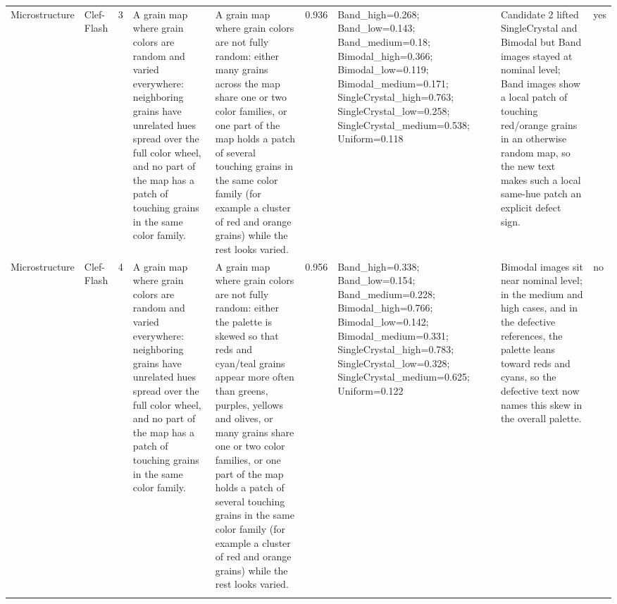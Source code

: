 \begin{table}
\begin{tabular}[t]{llrllrlll}
Microstructure & Clef-Flash & 3 & A grain map where grain colors are random and varied everywhere: neighboring grains have unrelated hues spread over the full color wheel, and no part of the map has a patch of touching grains in the same color family. & A grain map where grain colors are not fully random: either many grains across the map share one or two color families, or one part of the map holds a patch of several touching grains in the same color family (for example a cluster of red and orange grains) while the rest looks varied. & 0.936 & Band\_high=0.268; Band\_low=0.143; Band\_medium=0.18; Bimodal\_high=0.366; Bimodal\_low=0.119; Bimodal\_medium=0.171; SingleCrystal\_high=0.763; SingleCrystal\_low=0.258; SingleCrystal\_medium=0.538; Uniform=0.118 & Candidate 2 lifted SingleCrystal and Bimodal but Band images stayed at nominal level; Band images show a local patch of touching red/orange grains in an otherwise random map, so the new text makes such a local same-hue patch an explicit defect sign. & yes\\
Microstructure & Clef-Flash & 4 & A grain map where grain colors are random and varied everywhere: neighboring grains have unrelated hues spread over the full color wheel, and no part of the map has a patch of touching grains in the same color family. & A grain map where grain colors are not fully random: either the palette is skewed so that reds and cyan/teal grains appear more often than greens, purples, yellows and olives, or many grains share one or two color families, or one part of the map holds a patch of several touching grains in the same color family (for example a cluster of red and orange grains) while the rest looks varied. & 0.956 & Band\_high=0.338; Band\_low=0.154; Band\_medium=0.228; Bimodal\_high=0.766; Bimodal\_low=0.142; Bimodal\_medium=0.331; SingleCrystal\_high=0.783; SingleCrystal\_low=0.328; SingleCrystal\_medium=0.625; Uniform=0.122 & Bimodal images sit near nominal level; in the medium and high cases, and in the defective references, the palette leans toward reds and cyans, so the defective text now names this skew in the overall palette. & no\\
\addlinespace

\end{tabular}
\end{table}
